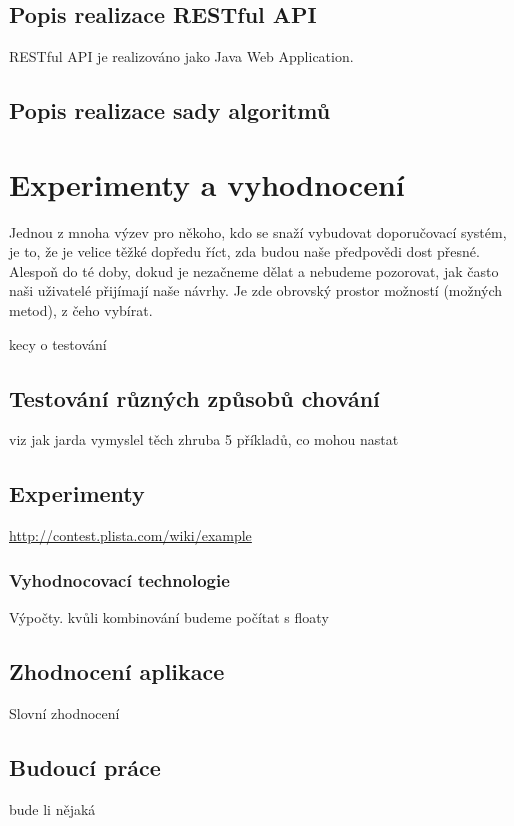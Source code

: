 \documentclass[thesis=M,czech]{FITthesis}[2014/05/07]
\begin{document}
\section{Popis realizace RESTful API}
\label{sub:restapi}

RESTful API je realizováno jako Java Web Application.



\section{Popis realizace sady algoritmů}
\label{sec:alg}


\chapter{Experimenty a vyhodnocení}
\label{chap:tests}

Jednou z mnoha výzev pro někoho, kdo se snaží vybudovat doporučovací systém, je to, že je velice těžké dopředu říct, zda budou naše předpovědi dost přesné. Alespoň do té doby, dokud je nezačneme dělat a nebudeme pozorovat, jak často naši uživatelé přijímají naše návrhy. Je zde obrovský prostor možností (možných metod), z čeho vybírat. 

kecy o testování
\section{Testování různých způsobů chování}
viz jak jarda vymyslel těch zhruba 5 příkladů, co mohou nastat
\section{Experimenty}

\url{http://contest.plista.com/wiki/example}
	\subsection{Vyhodnocovací technologie}	
	Výpočty. kvůli kombinování budeme počítat s floaty
	

\section{Zhodnocení aplikace}
Slovní zhodnocení
\section{Budoucí práce}
bude li nějaká

\begin{conclusion}
\end{conclusion}
\end{document}
